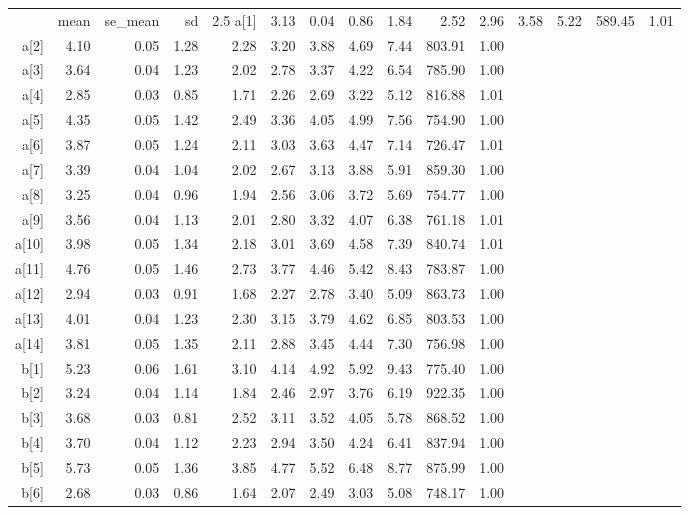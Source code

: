 \begin{longtable}{rrrrrrrrrrr}
  \hline
 & mean & se_mean & sd & 2.5%
  \hline \endhead  \hline
a[1] & 3.13 & 0.04 & 0.86 & 1.84 & 2.52 & 2.96 & 3.58 & 5.22 & 589.45 & 1.01 \\ 
  a[2] & 4.10 & 0.05 & 1.28 & 2.28 & 3.20 & 3.88 & 4.69 & 7.44 & 803.91 & 1.00 \\ 
  a[3] & 3.64 & 0.04 & 1.23 & 2.02 & 2.78 & 3.37 & 4.22 & 6.54 & 785.90 & 1.00 \\ 
  a[4] & 2.85 & 0.03 & 0.85 & 1.71 & 2.26 & 2.69 & 3.22 & 5.12 & 816.88 & 1.01 \\ 
  a[5] & 4.35 & 0.05 & 1.42 & 2.49 & 3.36 & 4.05 & 4.99 & 7.56 & 754.90 & 1.00 \\ 
  a[6] & 3.87 & 0.05 & 1.24 & 2.11 & 3.03 & 3.63 & 4.47 & 7.14 & 726.47 & 1.01 \\ 
  a[7] & 3.39 & 0.04 & 1.04 & 2.02 & 2.67 & 3.13 & 3.88 & 5.91 & 859.30 & 1.00 \\ 
  a[8] & 3.25 & 0.04 & 0.96 & 1.94 & 2.56 & 3.06 & 3.72 & 5.69 & 754.77 & 1.00 \\ 
  a[9] & 3.56 & 0.04 & 1.13 & 2.01 & 2.80 & 3.32 & 4.07 & 6.38 & 761.18 & 1.01 \\ 
  a[10] & 3.98 & 0.05 & 1.34 & 2.18 & 3.01 & 3.69 & 4.58 & 7.39 & 840.74 & 1.01 \\ 
  a[11] & 4.76 & 0.05 & 1.46 & 2.73 & 3.77 & 4.46 & 5.42 & 8.43 & 783.87 & 1.00 \\ 
  a[12] & 2.94 & 0.03 & 0.91 & 1.68 & 2.27 & 2.78 & 3.40 & 5.09 & 863.73 & 1.00 \\ 
  a[13] & 4.01 & 0.04 & 1.23 & 2.30 & 3.15 & 3.79 & 4.62 & 6.85 & 803.53 & 1.00 \\ 
  a[14] & 3.81 & 0.05 & 1.35 & 2.11 & 2.88 & 3.45 & 4.44 & 7.30 & 756.98 & 1.00 \\ 
  b[1] & 5.23 & 0.06 & 1.61 & 3.10 & 4.14 & 4.92 & 5.92 & 9.43 & 775.40 & 1.00 \\ 
  b[2] & 3.24 & 0.04 & 1.14 & 1.84 & 2.46 & 2.97 & 3.76 & 6.19 & 922.35 & 1.00 \\ 
  b[3] & 3.68 & 0.03 & 0.81 & 2.52 & 3.11 & 3.52 & 4.05 & 5.78 & 868.52 & 1.00 \\ 
  b[4] & 3.70 & 0.04 & 1.12 & 2.23 & 2.94 & 3.50 & 4.24 & 6.41 & 837.94 & 1.00 \\ 
  b[5] & 5.73 & 0.05 & 1.36 & 3.85 & 4.77 & 5.52 & 6.48 & 8.77 & 875.99 & 1.00 \\ 
  b[6] & 2.68 & 0.03 & 0.86 & 1.64 & 2.07 & 2.49 & 3.03 & 5.08 & 748.17 & 1.00 \\ 

\end{longtable}
